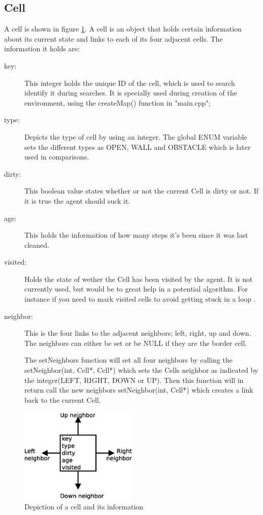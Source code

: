 \subsection{Cell}
A cell is shown in figure \ref{fig:cell}. A cell is an object that holds
certain information about its current state and links to each of its four
adjacent cells.  The information it holds are:
\begin{description}
\item[key:] 
This integer holds the unique ID of the cell, which is used to search identify 
it during searches. It is specially used during creation of the environment, 
using the createMap() function in "main.cpp";

\item[type:]
Depicts the type of cell by using an integer.  The global ENUM variable sets the
different types as OPEN, WALL and OBSTACLE which is later used in comparisons.

\item[dirty:]
This boolean value states whether or not the current Cell is dirty or not. If it
is true the agent should suck it.

\item[age:]
This holds the information of how many steps it's been since it was last
cleaned.

\item[visited:]
Holds the state of wether the Cell has been visited by the agent. It is not
currently used, but would be to great help in a potential algorithm. For
instance if you need to mark visited cells to avoid getting stuck in a loop .

\item[neighbor:]
This is the four links to the adjacent neighbors; left, right, up and down. The
neighbors can either be set or be NULL if they are the border cell.

The setNeighbors function will set all four neighbors by calling the
setNeighbor(int, Cell*, Cell*) which sets the Cells neighbor as indicated by the
integer(LEFT, RIGHT, DOWN or UP).  Then this function will in return call the
new neighbors setNeighbor(int, Cell*) which creates a link back to the current
Cell.
\end{description}

\begin{figure}[h] \label{fig:cell}	\centering
\includegraphics[width=0.5\textwidth]{cell}
\caption{Depiction of a cell and its information}
\end{figure}


